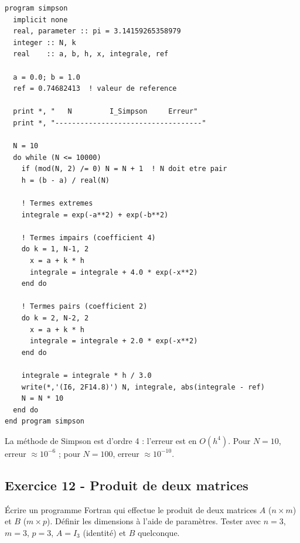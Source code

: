 \documentclass[12pt,a4paper]{article}
\begin{document}
\begin{boitecorrige}
\begin{lstlisting}
program simpson
  implicit none
  real, parameter :: pi = 3.14159265358979
  integer :: N, k
  real    :: a, b, h, x, integrale, ref

  a = 0.0; b = 1.0
  ref = 0.74682413  ! valeur de reference

  print *, "   N         I_Simpson     Erreur"
  print *, "-----------------------------------"

  N = 10
  do while (N <= 10000)
    if (mod(N, 2) /= 0) N = N + 1  ! N doit etre pair
    h = (b - a) / real(N)

    ! Termes extremes
    integrale = exp(-a**2) + exp(-b**2)

    ! Termes impairs (coefficient 4)
    do k = 1, N-1, 2
      x = a + k * h
      integrale = integrale + 4.0 * exp(-x**2)
    end do

    ! Termes pairs (coefficient 2)
    do k = 2, N-2, 2
      x = a + k * h
      integrale = integrale + 2.0 * exp(-x**2)
    end do

    integrale = integrale * h / 3.0
    write(*,'(I6, 2F14.8)') N, integrale, abs(integrale - ref)
    N = N * 10
  end do
end program simpson
\end{lstlisting}

La méthode de Simpson est d'ordre 4 : l'erreur est en $O(h^4)$. Pour $N=10$, erreur $\approx 10^{-6}$ ; pour $N=100$, erreur $\approx 10^{-10}$.
\end{boitecorrige}

\subsection*{Exercice 12 - Produit de deux matrices \niveau{\moyen}}

\begin{boiteexercice}
Écrire un programme Fortran qui effectue le produit de deux matrices $A$ ($n\times m$) et $B$ ($m\times p$). Définir les dimensions à l'aide de paramètres. Tester avec $n=3$, $m=3$, $p=3$, $A = I_3$ (identité) et $B$ quelconque.
\end{boiteexercice}
\end{document}
